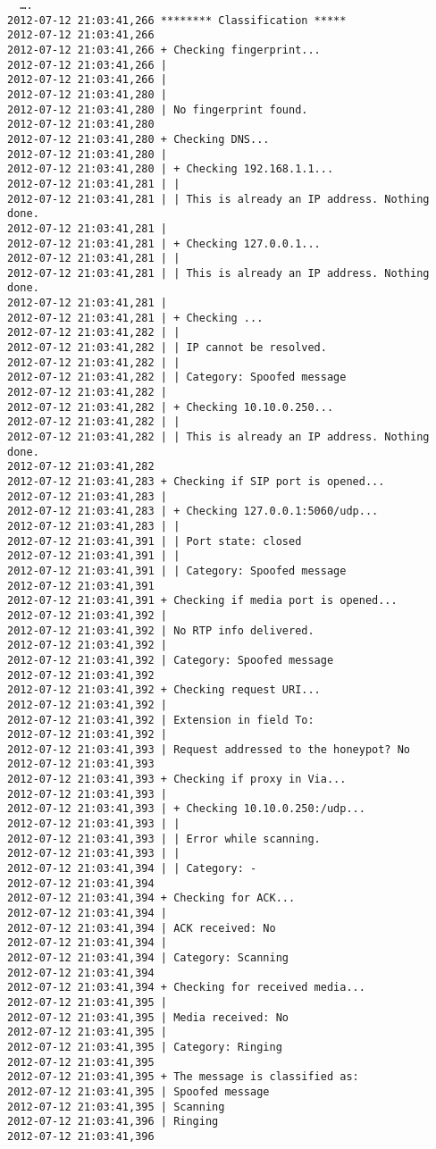 \documentclass[a4paper,12pt]{report}
\newenvironment{myscriptlisting}
{\begin{list}{}{\setlength{\leftmargin}{1em}}\item\scriptsize\bfseries}
{\end{list}}
\begin{document}
\begin{myscriptlisting}
 \begin{verbatim}
  ….
2012-07-12 21:03:41,266 ******** Classification *****
2012-07-12 21:03:41,266 
2012-07-12 21:03:41,266 + Checking fingerprint...
2012-07-12 21:03:41,266 |
2012-07-12 21:03:41,266 | 
2012-07-12 21:03:41,280 |
2012-07-12 21:03:41,280 | No fingerprint found.
2012-07-12 21:03:41,280 
2012-07-12 21:03:41,280 + Checking DNS...
2012-07-12 21:03:41,280 |
2012-07-12 21:03:41,280 | + Checking 192.168.1.1...
2012-07-12 21:03:41,281 | |
2012-07-12 21:03:41,281 | | This is already an IP address. Nothing done.
2012-07-12 21:03:41,281 |
2012-07-12 21:03:41,281 | + Checking 127.0.0.1...
2012-07-12 21:03:41,281 | |
2012-07-12 21:03:41,281 | | This is already an IP address. Nothing done.
2012-07-12 21:03:41,281 |
2012-07-12 21:03:41,281 | + Checking ...
2012-07-12 21:03:41,282 | |
2012-07-12 21:03:41,282 | | IP cannot be resolved.
2012-07-12 21:03:41,282 | |
2012-07-12 21:03:41,282 | | Category: Spoofed message
2012-07-12 21:03:41,282 |
2012-07-12 21:03:41,282 | + Checking 10.10.0.250...
2012-07-12 21:03:41,282 | |
2012-07-12 21:03:41,282 | | This is already an IP address. Nothing done.
2012-07-12 21:03:41,282 
2012-07-12 21:03:41,283 + Checking if SIP port is opened...
2012-07-12 21:03:41,283 |
2012-07-12 21:03:41,283 | + Checking 127.0.0.1:5060/udp...
2012-07-12 21:03:41,283 | |
2012-07-12 21:03:41,391 | | Port state: closed
2012-07-12 21:03:41,391 | |
2012-07-12 21:03:41,391 | | Category: Spoofed message
2012-07-12 21:03:41,391 
2012-07-12 21:03:41,391 + Checking if media port is opened...
2012-07-12 21:03:41,392 |
2012-07-12 21:03:41,392 | No RTP info delivered.
2012-07-12 21:03:41,392 |
2012-07-12 21:03:41,392 | Category: Spoofed message
2012-07-12 21:03:41,392 
2012-07-12 21:03:41,392 + Checking request URI...
2012-07-12 21:03:41,392 |
2012-07-12 21:03:41,392 | Extension in field To: 
2012-07-12 21:03:41,392 |
2012-07-12 21:03:41,393 | Request addressed to the honeypot? No
2012-07-12 21:03:41,393 
2012-07-12 21:03:41,393 + Checking if proxy in Via...
2012-07-12 21:03:41,393 |
2012-07-12 21:03:41,393 | + Checking 10.10.0.250:/udp...
2012-07-12 21:03:41,393 | |
2012-07-12 21:03:41,393 | | Error while scanning.
2012-07-12 21:03:41,393 | |
2012-07-12 21:03:41,394 | | Category: -
2012-07-12 21:03:41,394 
2012-07-12 21:03:41,394 + Checking for ACK...
2012-07-12 21:03:41,394 |
2012-07-12 21:03:41,394 | ACK received: No
2012-07-12 21:03:41,394 |
2012-07-12 21:03:41,394 | Category: Scanning
2012-07-12 21:03:41,394 
2012-07-12 21:03:41,394 + Checking for received media...
2012-07-12 21:03:41,395 |
2012-07-12 21:03:41,395 | Media received: No
2012-07-12 21:03:41,395 |
2012-07-12 21:03:41,395 | Category: Ringing
2012-07-12 21:03:41,395 
2012-07-12 21:03:41,395 + The message is classified as:
2012-07-12 21:03:41,395 | Spoofed message
2012-07-12 21:03:41,395 | Scanning
2012-07-12 21:03:41,396 | Ringing
2012-07-12 21:03:41,396
 \end{verbatim}
\end{myscriptlisting}
\end{document}
